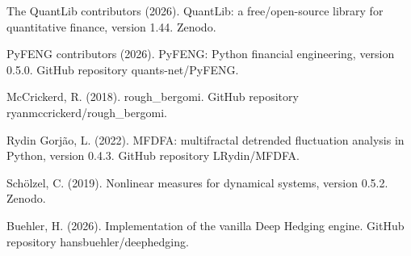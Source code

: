  The QuantLib contributors (2026). QuantLib: a
free/open-source library for quantitative finance, version 1.44. Zenodo.

 PyFENG contributors (2026). PyFENG: Python financial
engineering, version 0.5.0. GitHub repository quants-net/PyFENG.

 McCrickerd, R. (2018). rough\_bergomi. GitHub
repository ryanmccrickerd/rough\_bergomi.

 Rydin Gorjão, L. (2022). MFDFA: multifractal detrended
fluctuation analysis in Python, version 0.4.3. GitHub repository LRydin/MFDFA.

 Schölzel, C. (2019). Nonlinear measures for dynamical
systems, version 0.5.2. Zenodo.

 Buehler, H. (2026). Implementation of the vanilla Deep
Hedging engine. GitHub repository hansbuehler/deephedging.

